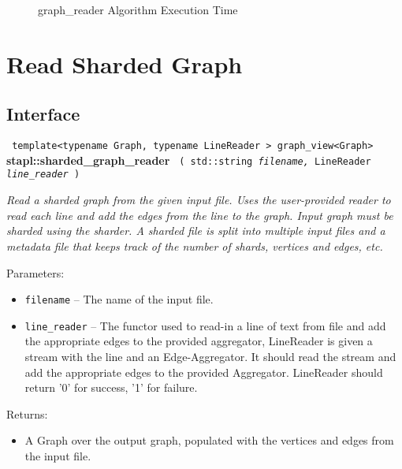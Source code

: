 \begin{figure}[p]
\caption{ graph\_reader Algorithm Execution Time}
\label{fig:rd-graf-alg-exec-exper}
\end{figure}


\section{ Read Sharded Graph}
\label{sec-shard-rd-graf-alg}

\subsection{Interface} \label{sec-shard-rd-graf-alg-inter}

\noindent
\texttt{%
template<typename Graph, typename LineReader >
\newline
graph\_view<Graph> 
}
\newline
\textbf{stapl::sharded\_graph\_reader}%
\newline
\texttt{%
(
std::string
\textit{filename,}%
LineReader
\textit{line\_reader}%
)     
}
\vspace{0.4cm}

\textit{
Read a sharded graph from the given input file.  
Uses the user-provided reader to read each line and add the edges from the line to the graph. 
Input graph must be sharded using the sharder. 
A sharded file is split into multiple input files and a metadata file that keeps track of the number of shards, vertices and edges, etc.
}
\vspace{0.4cm}

Parameters:
\begin{itemize}
\item
\texttt{filename} --
The name of the input file.
\item
\texttt{line\_reader} --
The functor used to read-in a line of text from file and add the appropriate edges to the provided aggregator, LineReader is given a stream with the line and an Edge-Aggregator. It should read the stream and add the appropriate edges to the provided Aggregator. LineReader should return '0' for success, '1' for failure.
\end{itemize}

Returns:
\begin{itemize}
\item
A Graph over the output graph, populated with the vertices and edges from the input file. 
\end{itemize}


